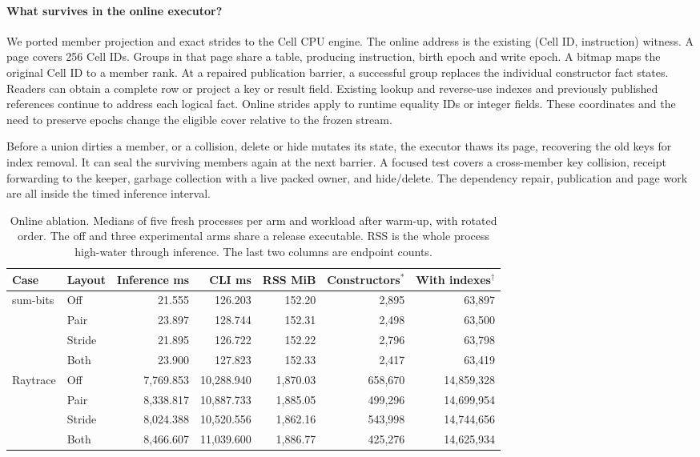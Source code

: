 \paragraph{What survives in the online executor?}
We ported member projection and exact strides to the Cell CPU engine. The online address is the existing (Cell ID, instruction) witness. A page covers 256 Cell IDs. Groups in that page share a table, producing instruction, birth epoch and write epoch. A bitmap maps the original Cell ID to a member rank. At a repaired publication barrier, a successful group replaces the individual constructor fact states. Readers can obtain a complete row or project a key or result field. Existing lookup and reverse-use indexes and previously published references continue to address each logical fact. Online strides apply to runtime equality IDs or integer fields. These coordinates and the need to preserve epochs change the eligible cover relative to the frozen stream.

Before a union dirties a member, or a collision, delete or hide mutates its state, the executor thaws its page, recovering the old keys for index removal. It can seal the surviving members again at the next barrier. A focused test covers a cross-member key collision, receipt forwarding to the keeper, garbage collection with a live packed owner, and hide/delete. The dependency repair, publication and page work are all inside the timed inference interval.

\begin{table}[ht]
\centering\small
\caption{Online ablation. Medians of five fresh processes per arm and workload after warm-up, with rotated order. The off and three experimental arms share a release executable. RSS is the whole process high-water through inference. The last two columns are endpoint counts.}
\label{tab:online}
\begin{tabular}{llrrrrr}
\toprule
Case & Layout & Inference ms & CLI ms & RSS MiB & Constructors$^*$ & With indexes$^\dagger$\\
\midrule
sum-bits & Off &21.555&126.203&152.20&2,895&63,897\\
 & Pair &23.897&128.744&152.31&2,498&63,500\\
 & Stride &21.895&126.722&152.22&2,796&63,798\\
 & Both &23.900&127.823&152.33&2,417&63,419\\
\midrule
Raytrace & Off &7,769.853&10,288.940&1,870.03&658,670&14,859,328\\
 & Pair &8,338.817&10,887.733&1,885.05&499,296&14,699,954\\
 & Stride &8,024.388&10,520.556&1,862.16&543,998&14,744,656\\
 & Both &8,466.607&11,039.600&1,886.77&425,276&14,625,934\\
\bottomrule
\end{tabular}
\end{table}

